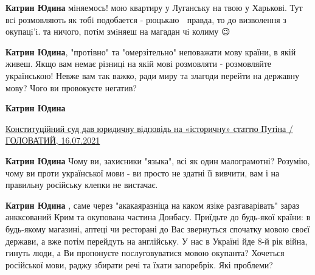 \begin{itemize}
\begin{itemize}
 
\textbf{Катрин Юдина} мiняемось! мою квартиру у Луганську на твою у Харьковi.
Тут всi розмовляють як тобi подобается - рюцькаю 🤷 правда, то до визволення з
окупацi'i. та ничого, потiм змiняеш на магадан чi колиму 😉

 
\textbf{Катрин Юдина}, "протівно" та "омерзітельно" неповажати мову країни, в
якій живеш. Якщо вам немає різниці на якій мові розмовляти - розмовляйте
українською! Невже вам так важко, ради миру та злагоди перейти на державну
мову? Чого ви провокуєте негатив?

 
\textbf{Катрин Юдина}

\href{https://www.youtube.com/watch?v=vvL0XGUc5qA}{%
Конституційний суд дав юридичну відповідь на «історичну» статтю Путіна / ГОЛОВАТИЙ, 16.07.2021%
}

 
\textbf{Катрин Юдина} Чому ви, захисники "языка", всі як один малограмотні?
Розумію, чому ви проти української мови - ви просто не здатні її вивчити, вам і
на правильну російську клепки не вистачає.

 
\textbf{Катрин Юдина} , саме через "акакаяразніца на каком язіке разгаварівать"
зараз анкксований Крим та окупована частина Донбасу. Приїдьте до будь-якої
країни: в будь-якому магазині, аптеці чи ресторані до Вас звернуться спочатку
мовою своєї держави, а вже потім перейдуть на англійську. У нас в Україні йде
8-й рік війна, гинуть люди, а Ви пропонуєте послуговуватися мовою окупанта?
Хочеться російської мови, раджу збирати речі та їхати запоребрік. Які проблеми?


\end{itemize}
\end{itemize}
